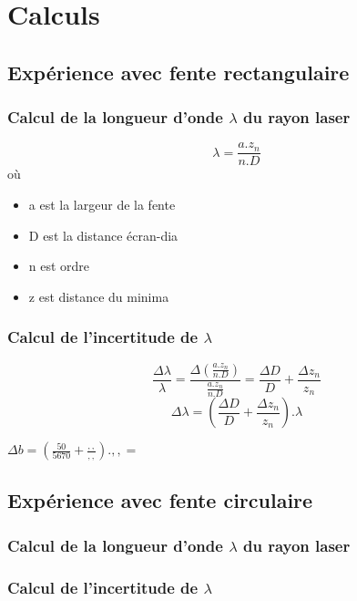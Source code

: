 \documentclass[11pt,a4paper]{report}
\begin{document}
	\section{Calculs}
		\subsection{Expérience avec fente rectangulaire}
		\subsubsection{Calcul de la longueur d'onde $\lambda$ du rayon laser}
		\begin{equation}
		\lambda = \frac{a.z_{n}}{n.D}		
		\end{equation}		 
		où
		 \begin{itemize}
		  \item a est la largeur de la fente
		  \item D est la distance écran-dia
		  \item n est ordre
		  \item z est distance du minima 
		 \end{itemize}
		
				
		\subsubsection{Calcul de l'incertitude de $\lambda$}
		\begin{equation}
		\frac{\Delta \lambda}{\lambda} = \frac{\Delta\left(\frac{a.z_{n}}{n.D}\right)}{\frac{a.z_{n}}{n.D}} 
		= \frac{\Delta D}{D}+\frac{\Delta z_{n}}{z_{n}}
		\end{equation}
		\begin{equation}
		\Delta \lambda
		= \left(\frac{\Delta D}{D}+\frac{\Delta z_{n}}{z_{n}}\right).\lambda
		\end{equation}
		\begin{center}
		$\Delta b = \left(\frac{50}{5670}+\frac{,,}{,,}\right).,, = $
		\end{center}
		\subsection{Expérience avec fente circulaire}
		\subsubsection{Calcul de la longueur d'onde $\lambda$ du rayon laser}
		\subsubsection{Calcul de l'incertitude de $\lambda$}
\end{document}
